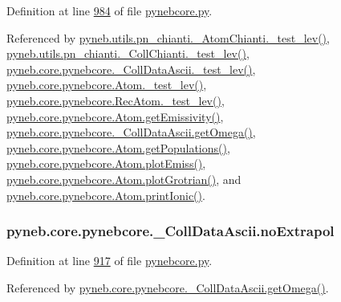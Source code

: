 Definition at line \hyperlink{pynebcore_8py_source_l00984}{984} of file \hyperlink{pynebcore_8py_source}{pynebcore.\+py}.



Referenced by \hyperlink{pn__chianti_8py_source_l00284}{pyneb.\+utils.\+pn\+\_\+chianti.\+\_\+\+Atom\+Chianti.\+\_\+test\+\_\+lev()}, \hyperlink{pn__chianti_8py_source_l00449}{pyneb.\+utils.\+pn\+\_\+chianti.\+\_\+\+Coll\+Chianti.\+\_\+test\+\_\+lev()}, \hyperlink{pynebcore_8py_source_l01026}{pyneb.\+core.\+pynebcore.\+\_\+\+Coll\+Data\+Ascii.\+\_\+test\+\_\+lev()}, \hyperlink{pynebcore_8py_source_l01459}{pyneb.\+core.\+pynebcore.\+Atom.\+\_\+test\+\_\+lev()}, \hyperlink{pynebcore_8py_source_l02596}{pyneb.\+core.\+pynebcore.\+Rec\+Atom.\+\_\+test\+\_\+lev()}, \hyperlink{pynebcore_8py_source_l01716}{pyneb.\+core.\+pynebcore.\+Atom.\+get\+Emissivity()}, \hyperlink{pynebcore_8py_source_l01063}{pyneb.\+core.\+pynebcore.\+\_\+\+Coll\+Data\+Ascii.\+get\+Omega()}, \hyperlink{pynebcore_8py_source_l01496}{pyneb.\+core.\+pynebcore.\+Atom.\+get\+Populations()}, \hyperlink{pynebcore_8py_source_l02313}{pyneb.\+core.\+pynebcore.\+Atom.\+plot\+Emiss()}, \hyperlink{pynebcore_8py_source_l02372}{pyneb.\+core.\+pynebcore.\+Atom.\+plot\+Grotrian()}, and \hyperlink{pynebcore_8py_source_l02167}{pyneb.\+core.\+pynebcore.\+Atom.\+print\+Ionic()}.

\hypertarget{classpyneb_1_1core_1_1pynebcore_1_1___coll_data_ascii_aa4f6c8d0a2a8e4ac6503d67b4a51188d}{}
\subsubsection[{no\+Extrapol}]{\setlength{\rightskip}{0pt plus 5cm}pyneb.\+core.\+pynebcore.\+\_\+\+Coll\+Data\+Ascii.\+no\+Extrapol}\label{classpyneb_1_1core_1_1pynebcore_1_1___coll_data_ascii_aa4f6c8d0a2a8e4ac6503d67b4a51188d}


Definition at line \hyperlink{pynebcore_8py_source_l00917}{917} of file \hyperlink{pynebcore_8py_source}{pynebcore.\+py}.



Referenced by \hyperlink{pynebcore_8py_source_l01063}{pyneb.\+core.\+pynebcore.\+\_\+\+Coll\+Data\+Ascii.\+get\+Omega()}.

\hypertarget{classpyneb_1_1core_1_1pynebcore_1_1___coll_data_ascii_a75f41e91e7eb224162912bedac22b342}{}
